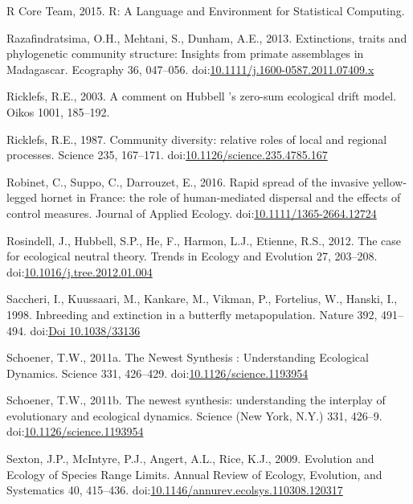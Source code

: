 \hypertarget{ref-Rcoreteam2015}{}
R Core Team, 2015. R: A Language and Environment for Statistical
Computing.

\hypertarget{ref-Razafindratsima2013}{}
Razafindratsima, O.H., Mehtani, S., Dunham, A.E., 2013. Extinctions,
traits and phylogenetic community structure: Insights from primate
assemblages in Madagascar. Ecography 36, 047--056.
doi:\href{https://doi.org/10.1111/j.1600-0587.2011.07409.x}{10.1111/j.1600-0587.2011.07409.x}

\hypertarget{ref-Ricklefs2003}{}
Ricklefs, R.E., 2003. A comment on Hubbell 's zero-sum ecological drift
model. Oikos 1001, 185--192.

\hypertarget{ref-Ricklefs1987}{}
Ricklefs, R.E., 1987. Community diversity: relative roles of local and
regional processes. Science 235, 167--171.
doi:\href{https://doi.org/10.1126/science.235.4785.167}{10.1126/science.235.4785.167}

\hypertarget{ref-Robinet2016}{}
Robinet, C., Suppo, C., Darrouzet, E., 2016. Rapid spread of the
invasive yellow-legged hornet in France: the role of human-mediated
dispersal and the effects of control measures. Journal of Applied
Ecology.
doi:\href{https://doi.org/10.1111/1365-2664.12724}{10.1111/1365-2664.12724}

\hypertarget{ref-Rosindell2012}{}
Rosindell, J., Hubbell, S.P., He, F., Harmon, L.J., Etienne, R.S., 2012.
The case for ecological neutral theory. Trends in Ecology and Evolution
27, 203--208.
doi:\href{https://doi.org/10.1016/j.tree.2012.01.004}{10.1016/j.tree.2012.01.004}

\hypertarget{ref-Saccheri1998}{}
Saccheri, I., Kuussaari, M., Kankare, M., Vikman, P., Fortelius, W.,
Hanski, I., 1998. Inbreeding and extinction in a butterfly
metapopulation. Nature 392, 491--494.
doi:\href{https://doi.org/Doi\%2010.1038/33136}{Doi 10.1038/33136}

\hypertarget{ref-Schoener2011a}{}
Schoener, T.W., 2011a. The Newest Synthesis : Understanding Ecological
Dynamics. Science 331, 426--429.
doi:\href{https://doi.org/10.1126/science.1193954}{10.1126/science.1193954}

\hypertarget{ref-Schoener2011}{}
Schoener, T.W., 2011b. The newest synthesis: understanding the interplay
of evolutionary and ecological dynamics. Science (New York, N.Y.) 331,
426--9.
doi:\href{https://doi.org/10.1126/science.1193954}{10.1126/science.1193954}

\hypertarget{ref-Sexton2009}{}
Sexton, J.P., McIntyre, P.J., Angert, A.L., Rice, K.J., 2009. Evolution
and Ecology of Species Range Limits. Annual Review of Ecology,
Evolution, and Systematics 40, 415--436.
doi:\href{https://doi.org/10.1146/annurev.ecolsys.110308.120317}{10.1146/annurev.ecolsys.110308.120317}

